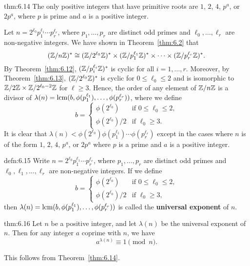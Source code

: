 \begin{theo}{thm:6.14}
    The only positive integers that have primitive roots are $1$, $2$, 
    $4$, $p^a$, or $2p^a$, where $p$ is prime and $a$ is a positive integer. 
\end{theo}
\begin{pf}
    Let $n = 2^{\ell_0} p_1^{\ell_1} \cdots p_r^{\ell_r}$, where $p_1, \dots, p_r$ 
    are distinct odd primes and $\ell_0, \dots, \ell_r$ are non-negative integers. 
    We have shown in Theorem~\ref{thm:6.2} that 
    \[ (\mathbb{Z}/n\mathbb{Z})^* \cong (\mathbb{Z}/2^{\ell_0}\mathbb{Z})^* \times (\mathbb{Z}/p_1^{\ell_1}\mathbb{Z})^* 
    \times \cdots \times (\mathbb{Z}/p_r^{\ell_r}\mathbb{Z})^*. \] 
    By Theorem~\ref{thm:6.12}, $(\mathbb{Z}/p_i^{\ell_i}\mathbb{Z})^*$ is cyclic for all 
    $i = 1, \dots, r$. Moreover, by Theorem~\ref{thm:6.13}, $(\mathbb{Z}/2^{\ell_0}\mathbb{Z})^*$ 
    is cyclic for $0 \leq \ell_0 \leq 2$ and is isomorphic to 
    $\mathbb{Z}/2\mathbb{Z} \times \mathbb{Z}/2^{\ell_0-2}\mathbb{Z}$ for $\ell \geq 3$. Hence, the order 
    of any element of $\mathbb{Z}/n\mathbb{Z}$ is a divisor of 
    $\lambda(n) = \operatorname{lcm}(b, \phi(p_1^{\ell_1}), \dots, \phi(p_r^{\ell_r}))$, 
    where we define 
    \[ b = \begin{cases} 
        \phi(2^{\ell_0}) & \text{if } 0 \leq \ell_0 \leq 2, \\ 
        \phi(2^{\ell_0})/2 & \text{if } \ell_0 \geq 3.
    \end{cases} \] 
    It is clear that $\lambda(n) < \phi(2^{\ell_0}) \phi(p_1^{\ell_1}) 
    \cdots \phi(p_r^{\ell_r})$ except in the cases where $n$ is of the form 
    $1$, $2$, $4$, $p^a$, or $2p^a$ where $p$ is a prime and $a$ is a positive 
    integer. 
\end{pf}

\begin{defn}{defn:6.15}
    Write $n = 2^{\ell_0} p_1^{\ell_1} \cdots p_r^{\ell_r}$, where 
    $p_1, \dots, p_r$ are distinct odd primes and $\ell_0, \ell_1, \dots, 
    \ell_r$ are non-negative integers. If we define 
    \[ b = \begin{cases} 
        \phi(2^{\ell_0}) & \text{if } 0 \leq \ell_0 \leq 2, \\ 
        \phi(2^{\ell_0})/2 & \text{if } \ell_0 \geq 3,
    \end{cases} \]
    then $\lambda(n) = \operatorname{lcm}(b, \phi(p_1^{\ell_1}), \dots, \phi(p_r^{\ell_r}))$ 
    is called the {\bf universal exponent} of $n$. 
\end{defn}

\begin{theo}{thm:6.16}
    Let $n$ be a positive integer, and let $\lambda(n)$ be the universal 
    exponent of $n$. Then for any integer $a$ coprime with $n$, we have 
    \[ a^{\lambda(n)} \equiv 1 \pmod n. \] 
\end{theo}
\begin{pf}
    This follows from Theorem~\ref{thm:6.14}. 
\end{pf}

